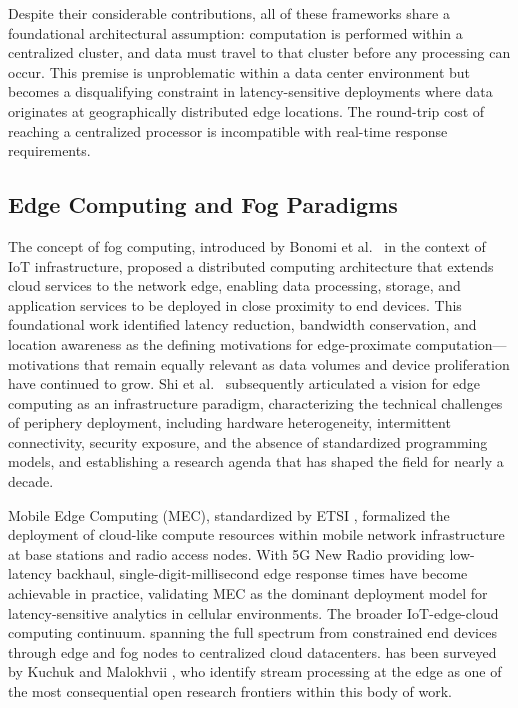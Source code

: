 \documentclass[preprint,review,12pt]{elsarticle}
\begin{document}
Despite their considerable contributions, all of these frameworks share a foundational architectural assumption: computation is performed within a centralized cluster, and data must travel to that cluster before any processing can occur. This premise is unproblematic within a data center environment but becomes a disqualifying constraint in latency-sensitive deployments where data originates at geographically distributed edge locations. The round-trip cost of reaching a centralized processor is incompatible with real-time response requirements.

\subsection{Edge Computing and Fog Paradigms}\label{edge-computing-and-fog-paradigms}

The concept of fog computing, introduced by Bonomi et al.~\cite{bonomi2012fog} in the context of IoT infrastructure, proposed a distributed computing architecture that extends cloud services to the network edge, enabling data processing, storage, and application services to be deployed in close proximity to end devices. This foundational work identified latency reduction, bandwidth conservation, and location awareness as the defining motivations for edge-proximate computation—motivations that remain equally relevant as data volumes and device proliferation have continued to grow. Shi et al.~\cite{shi2016edge} subsequently articulated a vision for edge computing as an infrastructure paradigm, characterizing the technical challenges of periphery deployment, including hardware heterogeneity, intermittent connectivity, security exposure, and the absence of standardized programming models, and establishing a research agenda that has shaped the field for nearly a decade.

Mobile Edge Computing (MEC), standardized by ETSI \cite{etsi2022mec}, formalized the deployment of cloud-like compute resources within mobile network infrastructure at base stations and radio access nodes. With 5G New Radio providing low-latency backhaul, single-digit-millisecond edge response times have become achievable in practice, validating MEC as the dominant deployment model for latency-sensitive analytics in cellular environments. The broader IoT-edge-cloud computing continuum. spanning the full spectrum from constrained end devices through edge and fog nodes to centralized cloud datacenters. has been surveyed by Kuchuk and Malokhvii \cite{kuchuk2024iot}, who identify stream processing at the edge as one of the most consequential open research frontiers within this body of work.
\end{document}
